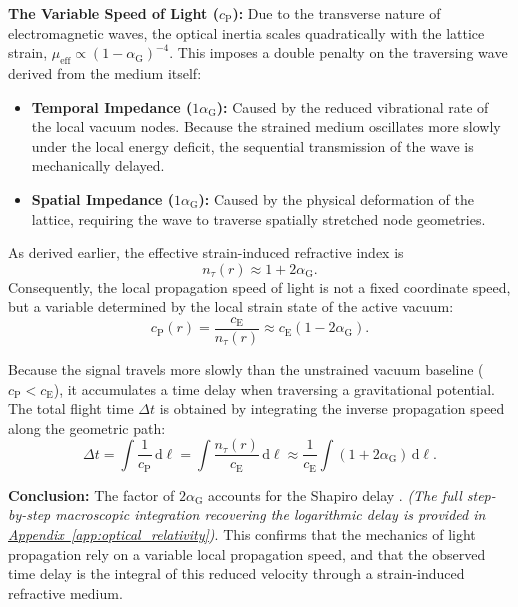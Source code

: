 \noindent \textbf{The Variable Speed of Light ($c_{\mathrm{P}}$):} Due to the transverse nature of electromagnetic waves, the optical inertia scales quadratically with the lattice strain, $\mu_{\mathrm{eff}} \propto (1 - \alpha_{\mathrm{G}})^{-4}$. This imposes a double penalty on the traversing wave derived from the medium itself:
\begin{itemize}
    \item \textbf{Temporal Impedance ($1\alpha_{\mathrm{G}}$):} Caused by the reduced vibrational rate of the local vacuum nodes. Because the strained medium oscillates more slowly under the local energy deficit, the sequential transmission of the wave is mechanically delayed.
    \item \textbf{Spatial Impedance ($1\alpha_{\mathrm{G}}$):} Caused by the physical deformation of the lattice, requiring the wave to traverse spatially stretched node geometries.
\end{itemize}

As derived earlier, the effective strain-induced refractive index is
\begin{equation}
    n_\tau(r) \approx 1 + 2\alpha_{\mathrm{G}}.
\end{equation}
Consequently, the local propagation speed of light is not a fixed coordinate speed, but a variable determined by the local strain state of the active vacuum:
\begin{equation}
    c_{\mathrm{P}}(r) = \frac{c_{\mathrm{E}}}{n_\tau(r)} \approx c_{\mathrm{E}}(1 - 2\alpha_{\mathrm{G}}).
\end{equation}

Because the signal travels more slowly than the unstrained vacuum baseline ($c_{\mathrm{P}} < c_{\mathrm{E}}$), it accumulates a time delay when traversing a gravitational potential. The total flight time $\Delta t$ is obtained by integrating the inverse propagation speed along the geometric path:
\begin{equation}
    \Delta t = \int \frac{1}{c_{\mathrm{P}}} \, \mathrm{d}\ell = \int \frac{n_\tau(r)}{c_{\mathrm{E}}} \, \mathrm{d}\ell \approx \frac{1}{c_{\mathrm{E}}} \int (1 + 2\alpha_{\mathrm{G}}) \, \mathrm{d}\ell .
\end{equation}

\noindent\textbf{Conclusion:} The factor of $2\alpha_{\mathrm{G}}$ accounts for the Shapiro delay \cite{Shapiro_1964}. \textit{(The full step-by-step macroscopic integration recovering the logarithmic delay is provided in \hyperref[app:optical_relativity]{Appendix~\ref*{app:optical_relativity}})}. This confirms that the mechanics of light propagation rely on a variable local propagation speed, and that the observed time delay is the integral of this reduced velocity through a strain-induced refractive medium.
\vspace{0.5em}

